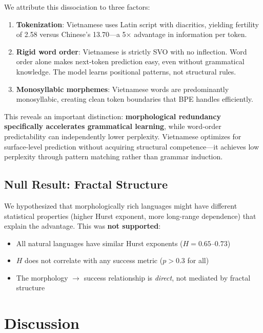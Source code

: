\documentclass[11pt]{article}
\begin{document}
We attribute this dissociation to three factors:

\begin{enumerate}
    \item \textbf{Tokenization}: Vietnamese uses Latin script with diacritics, yielding fertility of 2.58 versus Chinese's 13.70—a 5× advantage in information per token.

    \item \textbf{Rigid word order}: Vietnamese is strictly SVO with no inflection. Word order alone makes next-token prediction easy, even without grammatical knowledge. The model learns positional patterns, not structural rules.

    \item \textbf{Monosyllabic morphemes}: Vietnamese words are predominantly monosyllabic, creating clean token boundaries that BPE handles efficiently.
\end{enumerate}

This reveals an important distinction: \textbf{morphological redundancy specifically accelerates grammatical learning}, while word-order predictability can independently lower perplexity. Vietnamese optimizes for surface-level prediction without acquiring structural competence—it achieves low perplexity through pattern matching rather than grammar induction.

\subsection{Null Result: Fractal Structure}

We hypothesized that morphologically rich languages might have different statistical properties (higher Hurst exponent, more long-range dependence) that explain the advantage. This was \textbf{not supported}:

\begin{itemize}
    \item All natural languages have similar Hurst exponents ($H = 0.65$--$0.73$)
    \item $H$ does not correlate with any success metric ($p > 0.3$ for all)
    \item The morphology $\rightarrow$ success relationship is \textit{direct}, not mediated by fractal structure
\end{itemize}

\section{Discussion}
\end{document}
